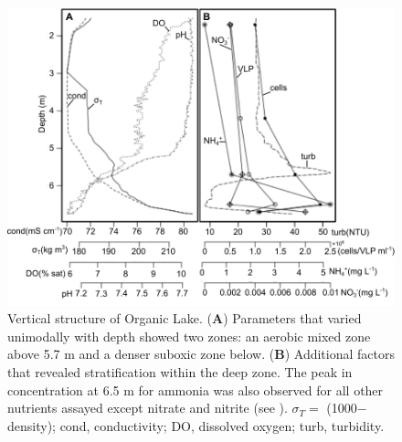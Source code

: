 \begin{figure}
\includegraphics{orglake_figures/physico_chem.pdf}
\caption[Vertical structure of Organic Lake]{Vertical structure of Organic Lake. (\textbf{A}) Parameters that varied unimodally with depth showed two zones: an aerobic mixed zone above 5.7 m and a denser suboxic zone below. (\textbf{B}) Additional factors that revealed stratification within the deep zone. The peak in concentration at 6.5 m for ammonia was also observed for all other nutrients assayed except nitrate and nitrite (see ). $\sigma_{T} =$ (1000$-$density); cond, conductivity; \textsc{DO}, dissolved oxygen; turb, turbidity.}
\label{fig:vert_struc}

\end{figure}
